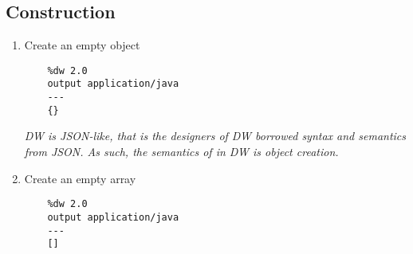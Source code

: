 \subsection{Construction}
\begin{enumerate}[resume*]
\item Create an empty object
  \begin{verbatim}
    %dw 2.0
    output application/java
    ---
    {}
  \end{verbatim}
  \emph{
    DW is JSON-like, that is the designers of DW borrowed syntax and semantics from JSON.  As such, the semantics of \ttt{{}} in DW is object creation.   
  }
\item Create an empty array
  \begin{verbatim}
    %dw 2.0
    output application/java
    ---
    []
  \end{verbatim}
\end{enumerate}

